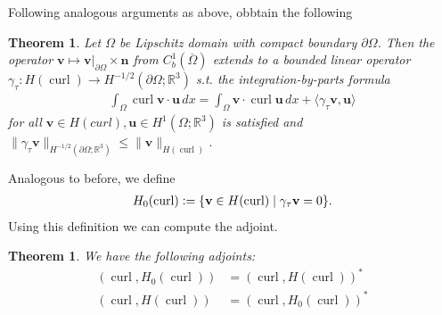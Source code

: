 \documentclass[12pt,a4paper]{article}
\numberwithin{equation}{subsection}
\numberwithin{lemma}{subsection}
\newtheorem{theorem}[lemma]{Theorem}
\theoremstyle{definition}
\DeclareMathOperator{\curl}{curl}
\newcommand{\real}{\mathbb{R}}
\begin{document}
Following analogous arguments as above, obbtain the following 
\begin{theorem}
    Let $\Omega$ be Lipschitz domain with compact boundary $\partial \Omega$.
    Then the operator $\mathbf{v} \mapsto \mathbf{v}|_{\partial \Omega} \times \mathbf{n}$ 
    from $C^1_b(\overline{\Omega})$ extends to a bounded linear operator 
    $\gamma_\tau: H(\curl) \rightarrow H^{-1/2}(\partial \Omega; \real^3)$ 
    s.t. the integration-by-parts formula 
    \begin{align*}
        \int_\Omega \curl \mathbf{v} \cdot \mathbf{u} \, dx = 
            \int_\Omega \mathbf{v} \cdot \curl \mathbf{u} \, dx
            + \langle \gamma_\tau \boldsymbol{v}, \boldsymbol{u} \rangle
    \end{align*}
    for all $\boldsymbol{v} \in H(curl), \boldsymbol{u} \in H^1(\Omega;\real^3)$
    is satisfied and 
    $\lVert \gamma_\tau \mathbf{v} \rVert _{H^{-1/2}(\partial \Omega; \real^3)} 
    \leq \lVert \mathbf{v} \rVert _{H(\curl)}$. 
\end{theorem}
Analogous to before, we define 
\begin{align*}
    H_0(\curl) \vcentcolon= \{ \mathbf{v} \in H(\curl) \mid \gamma_\tau \mathbf{v} = 0\}.
\end{align*}
Using this definition we can compute the adjoint.
\begin{theorem}
    We have the following adjoints:
    \begin{align*}
        (\curl, H_0(\curl)) &= (\curl, H(\curl))^* 
        \\ (\curl, H(\curl)) &= (\curl, H_0(\curl))^* 
    \end{align*}
\end{theorem}
\end{document}
